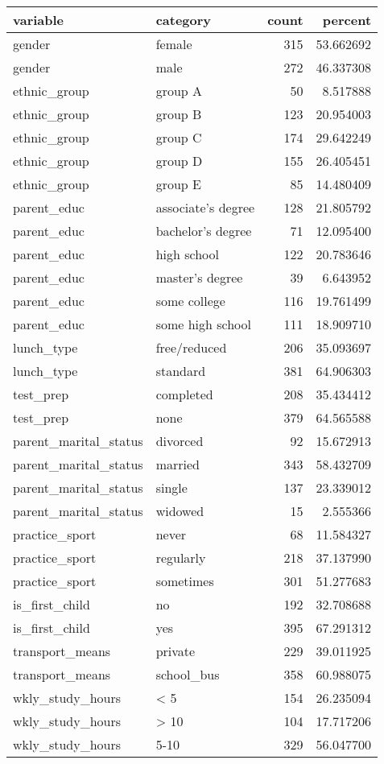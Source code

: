 \documentclass[
  12pt,
]{article}
\begin{document}
\begin{longtable}[]{@{}llrr@{}}
\toprule\noalign{}
variable & category & count & percent \\
\midrule\noalign{}
\endhead
\bottomrule\noalign{}
\endlastfoot
gender & female & 315 & 53.662692 \\
gender & male & 272 & 46.337308 \\
ethnic\_group & group A & 50 & 8.517888 \\
ethnic\_group & group B & 123 & 20.954003 \\
ethnic\_group & group C & 174 & 29.642249 \\
ethnic\_group & group D & 155 & 26.405451 \\
ethnic\_group & group E & 85 & 14.480409 \\
parent\_educ & associate's degree & 128 & 21.805792 \\
parent\_educ & bachelor's degree & 71 & 12.095400 \\
parent\_educ & high school & 122 & 20.783646 \\
parent\_educ & master's degree & 39 & 6.643952 \\
parent\_educ & some college & 116 & 19.761499 \\
parent\_educ & some high school & 111 & 18.909710 \\
lunch\_type & free/reduced & 206 & 35.093697 \\
lunch\_type & standard & 381 & 64.906303 \\
test\_prep & completed & 208 & 35.434412 \\
test\_prep & none & 379 & 64.565588 \\
parent\_marital\_status & divorced & 92 & 15.672913 \\
parent\_marital\_status & married & 343 & 58.432709 \\
parent\_marital\_status & single & 137 & 23.339012 \\
parent\_marital\_status & widowed & 15 & 2.555366 \\
practice\_sport & never & 68 & 11.584327 \\
practice\_sport & regularly & 218 & 37.137990 \\
practice\_sport & sometimes & 301 & 51.277683 \\
is\_first\_child & no & 192 & 32.708688 \\
is\_first\_child & yes & 395 & 67.291312 \\
transport\_means & private & 229 & 39.011925 \\
transport\_means & school\_bus & 358 & 60.988075 \\
wkly\_study\_hours & \textless{} 5 & 154 & 26.235094 \\
wkly\_study\_hours & \textgreater{} 10 & 104 & 17.717206 \\
wkly\_study\_hours & 5-10 & 329 & 56.047700 \\
\end{longtable}
\end{document}

